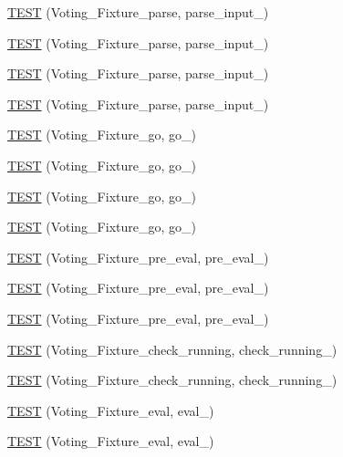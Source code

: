 \begin{DoxyCompactItemize}
\item 
\hyperlink{TestVoting_8c_09_09_a4bcb825a8410b4695fb3ffe92a7bf84b}{T\-E\-S\-T} (Voting\-\_\-\-Fixture\-\_\-parse, parse\-\_\-input\-\_)
\item 
\hyperlink{TestVoting_8c_09_09_a266b50e27464214c1cde89f6707d2a6b}{T\-E\-S\-T} (Voting\-\_\-\-Fixture\-\_\-parse, parse\-\_\-input\-\_)
\item 
\hyperlink{TestVoting_8c_09_09_ab0c5b3e60e99619ef5a85f5f362c4e8d}{T\-E\-S\-T} (Voting\-\_\-\-Fixture\-\_\-parse, parse\-\_\-input\-\_)
\item 
\hyperlink{TestVoting_8c_09_09_adb74a93ba68d3b8b5a877cc9de9969b5}{T\-E\-S\-T} (Voting\-\_\-\-Fixture\-\_\-parse, parse\-\_\-input\-\_)
\item 
\hyperlink{TestVoting_8c_09_09_a6428d22a37756df5458d35d75b7aad3f}{T\-E\-S\-T} (Voting\-\_\-\-Fixture\-\_\-go, go\-\_)
\item 
\hyperlink{TestVoting_8c_09_09_a2259393a1bf2b8577483073e5f55313b}{T\-E\-S\-T} (Voting\-\_\-\-Fixture\-\_\-go, go\-\_)
\item 
\hyperlink{TestVoting_8c_09_09_a1173ec7e787d8b5c25f86086572e4507}{T\-E\-S\-T} (Voting\-\_\-\-Fixture\-\_\-go, go\-\_)
\item 
\hyperlink{TestVoting_8c_09_09_a86fedec1a9149dbfd2f861def5891b62}{T\-E\-S\-T} (Voting\-\_\-\-Fixture\-\_\-go, go\-\_)
\item 
\hyperlink{TestVoting_8c_09_09_a2e3479a6dd8614d6c4764db9f3c0d8a4}{T\-E\-S\-T} (Voting\-\_\-\-Fixture\-\_\-pre\-\_\-eval, pre\-\_\-eval\-\_)
\item 
\hyperlink{TestVoting_8c_09_09_a7ba47b1176cd63f76390867f99cdd4c4}{T\-E\-S\-T} (Voting\-\_\-\-Fixture\-\_\-pre\-\_\-eval, pre\-\_\-eval\-\_)
\item 
\hyperlink{TestVoting_8c_09_09_a595add4e8757d76f372cb1faf2da8bab}{T\-E\-S\-T} (Voting\-\_\-\-Fixture\-\_\-pre\-\_\-eval, pre\-\_\-eval\-\_)
\item 
\hyperlink{TestVoting_8c_09_09_a927024141fcec202459f348e58498de2}{T\-E\-S\-T} (Voting\-\_\-\-Fixture\-\_\-check\-\_\-running, check\-\_\-running\-\_)
\item 
\hyperlink{TestVoting_8c_09_09_a2c8118a11687403055736045d6917cc8}{T\-E\-S\-T} (Voting\-\_\-\-Fixture\-\_\-check\-\_\-running, check\-\_\-running\-\_)
\item 
\hyperlink{TestVoting_8c_09_09_aad1283e2445308f6b59eed01a4ef0492}{T\-E\-S\-T} (Voting\-\_\-\-Fixture\-\_\-eval, eval\-\_)
\item 
\hyperlink{TestVoting_8c_09_09_a09e6a1655b555327cbdf8e15494568cc}{T\-E\-S\-T} (Voting\-\_\-\-Fixture\-\_\-eval, eval\-\_)
\end{DoxyCompactItemize}


